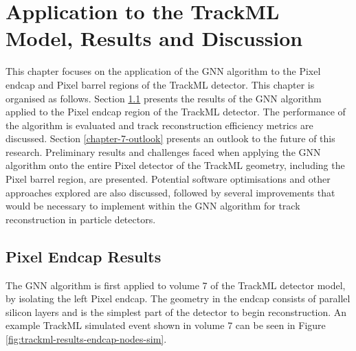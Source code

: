 
\chapter{Application to the TrackML Model, Results and Discussion}
\label{chapter-7}

This chapter focuses on the application of the GNN algorithm to the Pixel endcap and Pixel barrel regions of the TrackML detector. This chapter is organised as follows. Section \ref{chapter-7-endcap-results} presents the results of the GNN algorithm applied to the Pixel endcap region of the TrackML detector. The performance of the algorithm is evaluated and track reconstruction efficiency metrics are discussed. Section \ref{chapter-7-outlook} presents an outlook to the future of this research. Preliminary results and challenges faced when applying the GNN algorithm onto the entire Pixel detector of the TrackML geometry, including the Pixel barrel region, are presented. Potential software optimisations and other approaches explored are also discussed, followed by several improvements that would be necessary to implement within the GNN algorithm for track reconstruction in particle detectors.





\section{Pixel Endcap Results}
\label{chapter-7-endcap-results}

The GNN algorithm is first applied to volume 7 of the TrackML detector model, by isolating the left Pixel endcap. The geometry in the endcap consists of parallel silicon layers and is the simplest part of the detector to begin reconstruction. An example TrackML simulated event shown in volume 7 can be seen in Figure \ref{fig:trackml-results-endcap-nodes-sim}.

